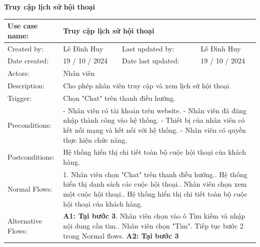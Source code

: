 \textbf{Truy cập lịch sử hội thoại}
\begin{table}[H]
    \centering
    \begin{tabular}{|l|l|l|l|} 
        \hline
        Use case name: & \multicolumn{3}{|l|}{Truy cập lịch sử hội thoại} \\
        \hline
        Created by: & Lê Đình Huy & Last updated by: & Lê Đình Huy \\
        \hline
        Date created: & 19 / 10 / 2024 & Date last updated: & 19 / 10 / 2024 \\
        \hline
        Actors: & \multicolumn{3}{|l|}{Nhân viên} \\
        \hline
        Description: & \multicolumn{3}{|p{12cm}|}{Cho phép nhân viên truy cập và xem lịch sử hội thoại.} \\ 
        \hline
        Trigger: & \multicolumn{3}{|p{12cm}|}{Chọn "Chat" trên thanh điều hướng.} \\
        \hline
        Preconditions: & \multicolumn{3}{|p{12cm}|}{- Nhân viên có tài khoản trên website. \newline
        - Nhân viên đã đăng nhập thành công vào hệ thống. \newline
        - Thiết bị của nhân viên có kết nối mạng và kết nối với hệ thống. \newline
        - Nhân viên có quyền thực hiện chức năng.} \\
        \hline
        Postconditions: & \multicolumn{3}{|p{12cm}|}{Hệ thống hiển thị chi tiết toàn bộ cuộc hội thoại của khách hàng.} \\
        \hline
        Normal Flows: & \multicolumn{3}{|p{12cm}|}{1. Nhân viên chọn "Chat" trên thanh điều hướng.\newline
        2. Hệ thống hiển thị danh sách các cuộc hội thoại.\newline
        3. Nhân viên chọn xem một cuộc hội thoại.\newline
        4. Hệ thống hiển thị chi tiết toàn bộ cuộc hội thoại của khách hàng.}\\
        \hline
        Alternative Flows: & \multicolumn{3}{|p{12cm}|}{
        \textbf{A1: Tại bước 3}\newline
        3.1. Nhân viên chọn vào ô Tìm kiếm và nhập nội dung cần tìm.\newline
        3.2. Nhân viên chọn "Tìm".\newline
        Tiếp tục bước 2 trong Normal flows.\newline
        \textbf{A2: Tại bước 3}\newline
}
\end{tabular}
\end{table}

